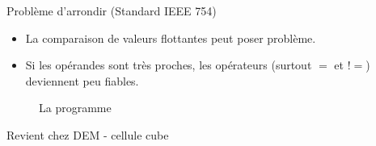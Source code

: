 \documentclass[10pt]{beamer}
\begin{document}
\begin{frame}{Problème d'arrondir (Standard IEEE 754)}
    \begin{itemize}
        \item La comparaison de valeurs flottantes peut poser problème.
        \item Si les opérandes sont très proches, les opérateurs (surtout $=$ et $!=$) deviennent peu fiables.
    \end{itemize}

    \begin{figure}[h]
        \centering
        \caption{La programme}
    \end{figure}
\end{frame}


\begin{frame}{Revient chez DEM - cellule cube}
    \begin{center}
    \end{center}
\end{frame}
\end{document}
